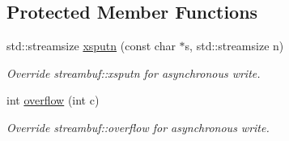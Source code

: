 \subsection*{Protected Member Functions}
\begin{DoxyCompactItemize}
\item 
std\+::streamsize \hyperlink{classpangolin_1_1threadedfilebuf_afcc794e847ef4313a4655d3352013bed}{xsputn} (const char $\ast$s, std\+::streamsize n)\hypertarget{classpangolin_1_1threadedfilebuf_afcc794e847ef4313a4655d3352013bed}{}\label{classpangolin_1_1threadedfilebuf_afcc794e847ef4313a4655d3352013bed}

\begin{DoxyCompactList}\small\item\em Override streambuf\+::xsputn for asynchronous write. \end{DoxyCompactList}\item 
int \hyperlink{classpangolin_1_1threadedfilebuf_ace93103b8c732bdf7ad2563eea9e3cde}{overflow} (int c)\hypertarget{classpangolin_1_1threadedfilebuf_ace93103b8c732bdf7ad2563eea9e3cde}{}\label{classpangolin_1_1threadedfilebuf_ace93103b8c732bdf7ad2563eea9e3cde}

\begin{DoxyCompactList}\small\item\em Override streambuf\+::overflow for asynchronous write. \end{DoxyCompactList}\end{DoxyCompactItemize}
